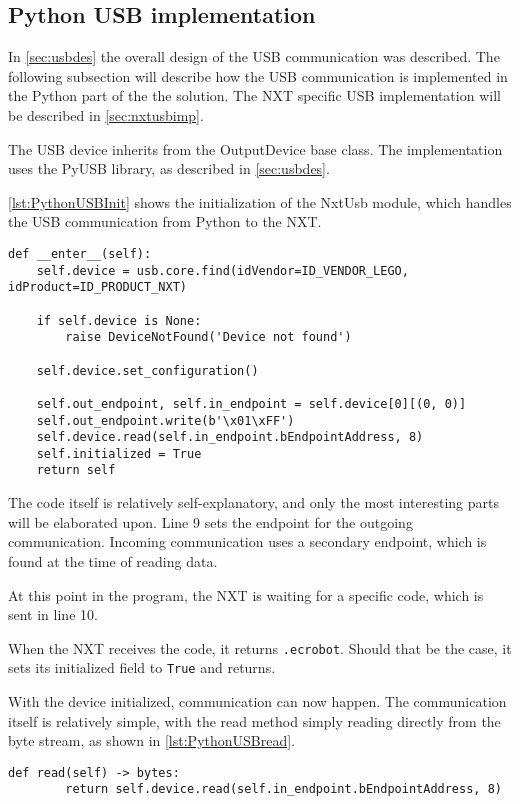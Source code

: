 \subsection{Python USB implementation}\label{sol:subsec:pythonusb}
In \autoref{sec:usbdes} the overall design of the USB communication was described.
The following subsection will describe how the USB communication is implemented in the Python part of the the solution.
The NXT specific USB implementation will be described in \autoref{sec:nxtusbimp}.

The USB device inherits from the OutputDevice base class.
The implementation uses the PyUSB library, as described in \autoref{sec:usbdes}\cite{PyUSB}.

\autoref{lst:PythonUSBInit} shows the initialization of the NxtUsb module, which handles the USB communication from Python to the NXT.
\begin{lstlisting}[label={lst:PythonUSBInit},caption={The initialization of PyUSB{.} Comments removed}]
def __enter__(self):
    self.device = usb.core.find(idVendor=ID_VENDOR_LEGO, idProduct=ID_PRODUCT_NXT)

    if self.device is None:
        raise DeviceNotFound('Device not found')

    self.device.set_configuration()

    self.out_endpoint, self.in_endpoint = self.device[0][(0, 0)]
    self.out_endpoint.write(b'\x01\xFF') 
    self.device.read(self.in_endpoint.bEndpointAddress, 8) 
    self.initialized = True
    return self
\end{lstlisting}

The code itself is relatively self-explanatory, and only the most interesting parts will be elaborated upon.
Line 9 sets the endpoint for the outgoing communication.
Incoming communication uses a secondary endpoint, which is found at the time of reading data.

At this point in the program, the NXT is waiting for a specific code, which is sent in line 10.

When the NXT receives the code, it returns \texttt{{.}ecrobot}.
Should that be the case, it sets its initialized field to \texttt{True} and returns.

With the device initialized, communication can now happen.
The communication itself is relatively simple, with the read method simply reading directly from the byte stream, as shown in \autoref{lst:PythonUSBread}.

\begin{lstlisting}[label={lst:PythonUSBread},caption={Reading from the USB port connected to the NXT}]
	def read(self) -> bytes:
		return self.device.read(self.in_endpoint.bEndpointAddress, 8)
\end{lstlisting}

